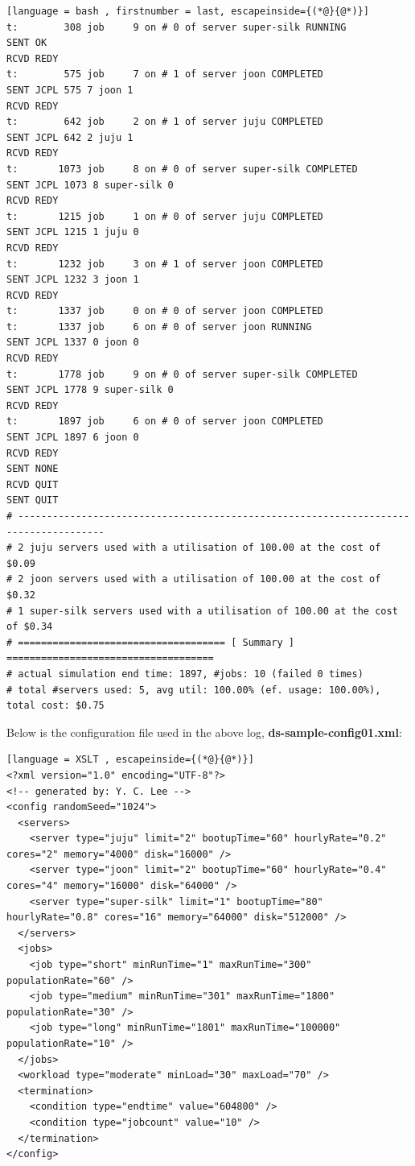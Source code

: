 \documentclass[a4paper]{article} %
\begin{document}
\begin{lstlisting}[language = bash , firstnumber = last, escapeinside={(*@}{@*)}]
t:        308 job     9 on # 0 of server super-silk RUNNING
SENT OK
RCVD REDY
t:        575 job     7 on # 1 of server joon COMPLETED
SENT JCPL 575 7 joon 1
RCVD REDY
t:        642 job     2 on # 1 of server juju COMPLETED
SENT JCPL 642 2 juju 1
RCVD REDY
t:       1073 job     8 on # 0 of server super-silk COMPLETED
SENT JCPL 1073 8 super-silk 0
RCVD REDY
t:       1215 job     1 on # 0 of server juju COMPLETED
SENT JCPL 1215 1 juju 0
RCVD REDY
t:       1232 job     3 on # 1 of server joon COMPLETED
SENT JCPL 1232 3 joon 1
RCVD REDY
t:       1337 job     0 on # 0 of server joon COMPLETED
t:       1337 job     6 on # 0 of server joon RUNNING
SENT JCPL 1337 0 joon 0
RCVD REDY
t:       1778 job     9 on # 0 of server super-silk COMPLETED
SENT JCPL 1778 9 super-silk 0
RCVD REDY
t:       1897 job     6 on # 0 of server joon COMPLETED
SENT JCPL 1897 6 joon 0
RCVD REDY
SENT NONE
RCVD QUIT
SENT QUIT
# -------------------------------------------------------------------------------------
# 2 juju servers used with a utilisation of 100.00 at the cost of $0.09
# 2 joon servers used with a utilisation of 100.00 at the cost of $0.32
# 1 super-silk servers used with a utilisation of 100.00 at the cost of $0.34
# ==================================== [ Summary ] ====================================
# actual simulation end time: 1897, #jobs: 10 (failed 0 times)
# total #servers used: 5, avg util: 100.00% (ef. usage: 100.00%), total cost: $0.75

\end{lstlisting}

Below is the configuration file used in the above log, \textbf{ds-sample-config01.xml}:

\begin{lstlisting}[language = XSLT , escapeinside={(*@}{@*)}]
<?xml version="1.0" encoding="UTF-8"?>
<!-- generated by: Y. C. Lee -->
<config randomSeed="1024">   
  <servers>
	<server type="juju" limit="2" bootupTime="60" hourlyRate="0.2" cores="2" memory="4000" disk="16000" />
	<server type="joon" limit="2" bootupTime="60" hourlyRate="0.4" cores="4" memory="16000" disk="64000" />
	<server type="super-silk" limit="1" bootupTime="80" hourlyRate="0.8" cores="16" memory="64000" disk="512000" />
  </servers>
  <jobs>
	<job type="short" minRunTime="1" maxRunTime="300" populationRate="60" />
	<job type="medium" minRunTime="301" maxRunTime="1800" populationRate="30" />
	<job type="long" minRunTime="1801" maxRunTime="100000" populationRate="10" />
  </jobs>
  <workload type="moderate" minLoad="30" maxLoad="70" />
  <termination>
	<condition type="endtime" value="604800" />
	<condition type="jobcount" value="10" />
  </termination>
</config> 
\end{lstlisting}
\end{document}
